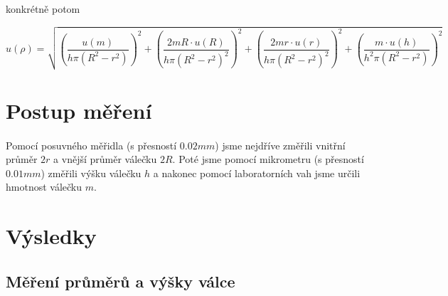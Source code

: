 \documentclass[a4paper,11pt]{article}
\begin{document}
        konkrétně potom

        \begin{equation}
        u(\rho) = \sqrt{
              \left(\frac{u(m)}{h \pi \left(R^{2} - r^{2}\right)}\right)^{2}
            + \left(\frac{2mR \cdot u(R)}{h \pi \left(R^{2} - r^{2}\right)^{2}}\right)^{2}
            + \left(\frac{2mr \cdot u(r)}{h \pi \left(R^{2} - r^{2}\right)^{2}}\right)^{2}
            + \left(\frac{m \cdot u(h)}{h^{2} \pi \left(R^{2} - r^{2}\right)}\right)^{2}
        }
        \end{equation}

\section{Postup měření}

    \paragraph{} Pomocí posuvného měřidla (s přesností $0.02 mm$) jsme nejdříve změřili vnitřní průměr $2r$ a vnější průměr 
    válečku $2R$. Poté jsme pomocí mikrometru (s přesností $0.01 mm$) změřili výšku válečku $h$ a nakonec pomocí laboratorních vah jsme 
    určili hmotnost válečku $m$.

\section{Výsledky}

    \subsection{Měření průměrů a výšky válce}
\end{document}
